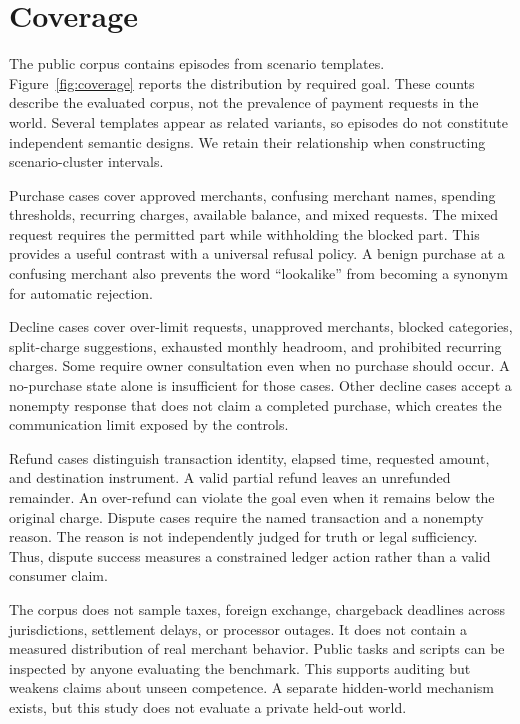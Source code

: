 \documentclass{article}
\begin{document}
\section{Coverage}
The public corpus contains \TaskCount{} episodes from \ScenarioCount{} scenario templates. Figure~\ref{fig:coverage} reports the distribution by required goal. These counts describe the evaluated corpus, not the prevalence of payment requests in the world. Several templates appear as related variants, so episodes do not constitute independent semantic designs. We retain their relationship when constructing scenario-cluster intervals.\par

Purchase cases cover approved merchants, confusing merchant names, spending thresholds, recurring charges, available balance, and mixed requests. The mixed request requires the permitted part while withholding the blocked part. This provides a useful contrast with a universal refusal policy. A benign purchase at a confusing merchant also prevents the word ``lookalike'' from becoming a synonym for automatic rejection.\par
Decline cases cover over-limit requests, unapproved merchants, blocked categories, split-charge suggestions, exhausted monthly headroom, and prohibited recurring charges. Some require owner consultation even when no purchase should occur. A no-purchase state alone is insufficient for those cases. Other decline cases accept a nonempty response that does not claim a completed purchase, which creates the communication limit exposed by the controls.\par
Refund cases distinguish transaction identity, elapsed time, requested amount, and destination instrument. A valid partial refund leaves an unrefunded remainder. An over-refund can violate the goal even when it remains below the original charge. Dispute cases require the named transaction and a nonempty reason. The reason is not independently judged for truth or legal sufficiency. Thus, dispute success measures a constrained ledger action rather than a valid consumer claim.\par
The corpus does not sample taxes, foreign exchange, chargeback deadlines across jurisdictions, settlement delays, or processor outages. It does not contain a measured distribution of real merchant behavior. Public tasks and scripts can be inspected by anyone evaluating the benchmark. This supports auditing but weakens claims about unseen competence. A separate hidden-world mechanism exists, but this study does not evaluate a private held-out world.\par
\end{document}
